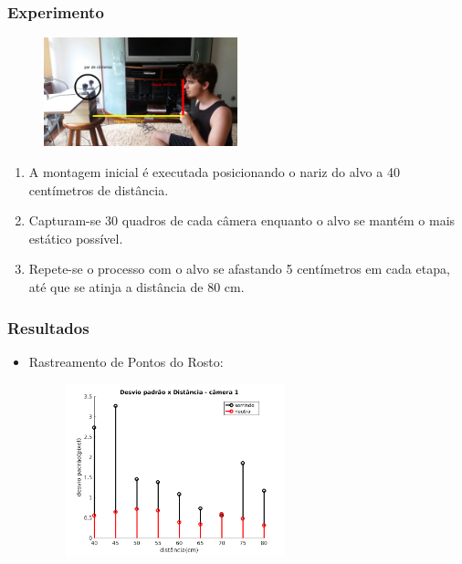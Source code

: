 \documentclass[brazil]{beamer}
\begin{document}
\begin{frame}
\frametitle{Experimento}
	\begin{figure}
        \centering
        \includegraphics[width = 0.5\textwidth, keepaspectratio]{./img/setup-exp.png}
      \end{figure}
  \begin{enumerate}
  

\item A montagem inicial é executada posicionando o nariz do alvo a 40 centímetros de distância.
\item Capturam-se 30 quadros de cada câmera enquanto o alvo se mantém o mais estático possível.
\item Repete-se o processo com o alvo se afastando 5 centímetros em cada etapa, até que se atinja a distância de 80 cm.
  \end{enumerate} 
\end{frame}

\begin{frame}
\frametitle{Resultados}
  \begin{itemize}
      \item Rastreamento de Pontos do Rosto:
      
       \begin{figure}
        \centering
        \includegraphics[width = 0.6\textwidth, keepaspectratio]{./img/desvio_cameraEsquerda.jpg}
      \end{figure}
          
  \end{itemize} 
\end{frame}
\end{document}
